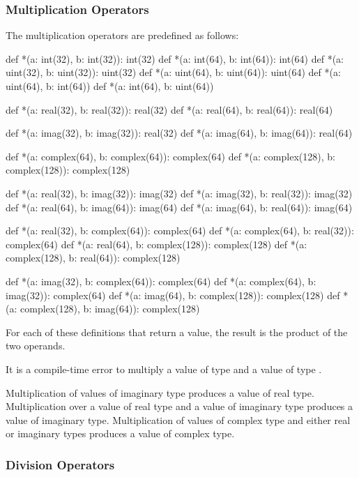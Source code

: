 \subsubsection{Multiplication Operators}
\label{Multiplication_Operators}

The multiplication operators are predefined as follows:
\begin{chapel}
def *(a: int(32), b: int(32)): int(32)
def *(a: int(64), b: int(64)): int(64)
def *(a: uint(32), b: uint(32)): uint(32)
def *(a: uint(64), b: uint(64)): uint(64)
def *(a: uint(64), b: int(64))
def *(a: int(64), b: uint(64))

def *(a: real(32), b: real(32)): real(32)
def *(a: real(64), b: real(64)): real(64)

def *(a: imag(32), b: imag(32)): real(32)
def *(a: imag(64), b: imag(64)): real(64)

def *(a: complex(64), b: complex(64)): complex(64)
def *(a: complex(128), b: complex(128)): complex(128)

def *(a: real(32), b: imag(32)): imag(32)
def *(a: imag(32), b: real(32)): imag(32)
def *(a: real(64), b: imag(64)): imag(64)
def *(a: imag(64), b: real(64)): imag(64)

def *(a: real(32), b: complex(64)): complex(64)
def *(a: complex(64), b: real(32)): complex(64)
def *(a: real(64), b: complex(128)): complex(128)
def *(a: complex(128), b: real(64)): complex(128)

def *(a: imag(32), b: complex(64)): complex(64)
def *(a: complex(64), b: imag(32)): complex(64)
def *(a: imag(64), b: complex(128)): complex(128)
def *(a: complex(128), b: imag(64)): complex(128)
\end{chapel}
For each of these definitions that return a value, the result is the
product of the two operands.

It is a compile-time error to multiply a value of type  and
a value of type .

Multiplication of values of imaginary type produces a value of real
type.  Multiplication over a value of real type and a value of
imaginary type produces a value of imaginary type.  Multiplication of
values of complex type and either real or imaginary types produces a
value of complex type.

\subsubsection{Division Operators}
\label{Division_Operators}

